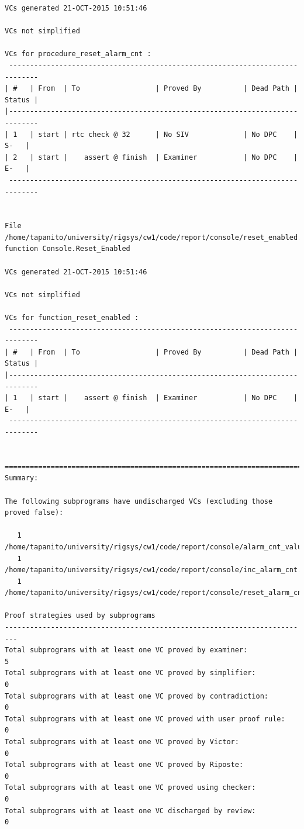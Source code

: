 \documentclass[a4paper, titlepage]{article}
\begin{document}
{\begin{lstlisting}
VCs generated 21-OCT-2015 10:51:46

VCs not simplified

VCs for procedure_reset_alarm_cnt :
 -----------------------------------------------------------------------------
| #   | From  | To                  | Proved By          | Dead Path | Status |
|-----------------------------------------------------------------------------
| 1   | start | rtc check @ 32      | No SIV             | No DPC    |   S-   |
| 2   | start |    assert @ finish  | Examiner           | No DPC    |   E-   |
 -----------------------------------------------------------------------------


File /home/tapanito/university/rigsys/cw1/code/report/console/reset_enabled.vcg
function Console.Reset_Enabled

VCs generated 21-OCT-2015 10:51:46

VCs not simplified

VCs for function_reset_enabled :
 -----------------------------------------------------------------------------
| #   | From  | To                  | Proved By          | Dead Path | Status |
|-----------------------------------------------------------------------------
| 1   | start |    assert @ finish  | Examiner           | No DPC    |   E-   |
 -----------------------------------------------------------------------------


===============================================================================
Summary:

The following subprograms have undischarged VCs (excluding those proved false):

   1  /home/tapanito/university/rigsys/cw1/code/report/console/alarm_cnt_value.vcg
   1  /home/tapanito/university/rigsys/cw1/code/report/console/inc_alarm_cnt.vcg
   1  /home/tapanito/university/rigsys/cw1/code/report/console/reset_alarm_cnt.vcg

Proof strategies used by subprograms
-------------------------------------------------------------------------
Total subprograms with at least one VC proved by examiner:              5
Total subprograms with at least one VC proved by simplifier:            0
Total subprograms with at least one VC proved by contradiction:         0
Total subprograms with at least one VC proved with user proof rule:     0
Total subprograms with at least one VC proved by Victor:                0
Total subprograms with at least one VC proved by Riposte:               0
Total subprograms with at least one VC proved using checker:            0
Total subprograms with at least one VC discharged by review:            0


\end{lstlisting}}
\end{document}
